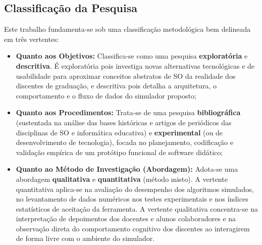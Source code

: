 \subsection{Classificação da Pesquisa}
Este trabalho fundamenta-se sob uma classificação metodológica bem delineada em três vertentes:
\begin{itemize}
    \item \textbf{Quanto aos Objetivos:} Classifica-se como uma pesquisa \textbf{exploratória} e \textbf{descritiva}. É exploratória pois investiga novas alternativas tecnológicas e de usabilidade para aproximar conceitos abstratos de SO da realidade dos discentes de graduação, e descritiva pois detalha a arquitetura, o comportamento e o fluxo de dados do simulador proposto;
    \item \textbf{Quanto aos Procedimentos:} Trata-se de uma pesquisa \textbf{bibliográfica} (sustentada na análise das bases históricas e artigos de periódicos das disciplinas de SO e informática educativa) e \textbf{experimental} (ou de desenvolvimento de tecnologia), focada no planejamento, codificação e validação empírica de um protótipo funcional de software didático;
    \item \textbf{Quanto ao Método de Investigação (Abordagem):} Adota-se uma abordagem \textbf{qualitativa} e \textbf{quantitativa} (método misto). A vertente quantitativa aplica-se na avaliação do desempenho dos algoritmos simulados, no levantamento de dados numéricos nos testes experimentais e nos índices estatísticos de aceitação da ferramenta. A vertente qualitativa concentra-se na interpretação de depoimentos dos docentes e alunos colaboradores e na observação direta do comportamento cognitivo dos discentes ao interagirem de forma livre com o ambiente do simulador.
\end{itemize}
